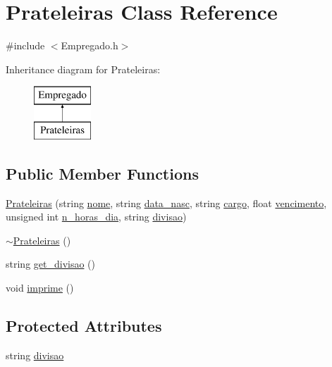 \hypertarget{class_prateleiras}{
\section{Prateleiras Class Reference}
\label{class_prateleiras}
}


{\ttfamily \#include $<$Empregado.h$>$}

Inheritance diagram for Prateleiras:\begin{figure}[H]
\begin{center}
\leavevmode
\includegraphics[height=2.000000cm]{class_prateleiras}
\end{center}
\end{figure}
\subsection*{Public Member Functions}
\begin{DoxyCompactItemize}
\item 
\hyperlink{class_prateleiras_a48c43128384d93376077920d232cb1e1}{Prateleiras} (string \hyperlink{class_empregado_a3ef62ed62672a17b1c7769eb0e954a34}{nome}, string \hyperlink{class_empregado_add428a10de63973303f960cd984e3c41}{data\_\-nasc}, string \hyperlink{class_empregado_a6a3290cc27e7d4c00d430fedd90254c9}{cargo}, float \hyperlink{class_empregado_a7580affd67f7e1c240c8c98cfd11e195}{vencimento}, unsigned int \hyperlink{class_empregado_ab8c2aa44f61f58fb592fc3d8a7466c34}{n\_\-horas\_\-dia}, string \hyperlink{class_prateleiras_af00b7d67673427771cfdb1edc09d7b80}{divisao})
\item 
\hyperlink{class_prateleiras_a59b23def95d005d694d1abee6308fca2}{$\sim$Prateleiras} ()
\item 
string \hyperlink{class_prateleiras_afe23f5f7bffe1791c1cbc13eaec8f212}{get\_\-divisao} ()
\item 
void \hyperlink{class_prateleiras_a767d19e0a99497fcdd173f3f20b0e9e9}{imprime} ()
\end{DoxyCompactItemize}
\subsection*{Protected Attributes}
\begin{DoxyCompactItemize}
\item 
string \hyperlink{class_prateleiras_af00b7d67673427771cfdb1edc09d7b80}{divisao}
\end{DoxyCompactItemize}


